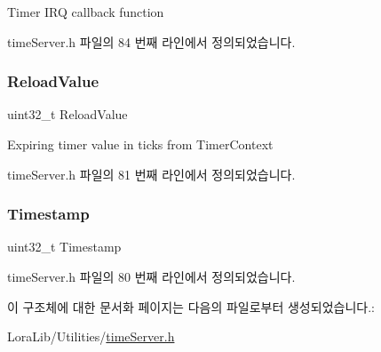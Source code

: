 Timer I\+RQ callback function 



time\+Server.\+h 파일의 84 번째 라인에서 정의되었습니다.

\mbox{\label{struct_timer_event__s_a670045cfad50e7e4b3a31c0119d6e4fd}} 
\subsubsection{\texorpdfstring{Reload\+Value}{ReloadValue}}
{\footnotesize\ttfamily uint32\+\_\+t Reload\+Value}



Expiring timer value in ticks from Timer\+Context 



time\+Server.\+h 파일의 81 번째 라인에서 정의되었습니다.

\mbox{\label{struct_timer_event__s_ae6678057e9ed5db32d6d2db84671c146}} 
\subsubsection{\texorpdfstring{Timestamp}{Timestamp}}
{\footnotesize\ttfamily uint32\+\_\+t Timestamp}



time\+Server.\+h 파일의 80 번째 라인에서 정의되었습니다.



이 구조체에 대한 문서화 페이지는 다음의 파일로부터 생성되었습니다.\+:\begin{DoxyCompactItemize}
\item 
Lora\+Lib/\+Utilities/\mbox{\hyperlink{time_server_8h}{time\+Server.\+h}}\end{DoxyCompactItemize}
